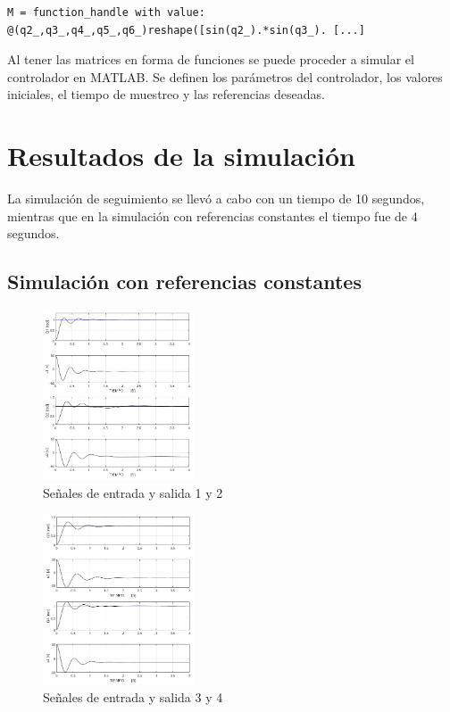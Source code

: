 \documentclass[conference]{IEEEtran}
\begin{document}
\begin{lstlisting}
M = function_handle with value: 
@(q2_,q3_,q4_,q5_,q6_)reshape([sin(q2_).*sin(q3_). [...]
\end{lstlisting}

Al tener las matrices en forma de funciones se puede proceder a simular el controlador en MATLAB. Se definen los parámetros del controlador, los valores iniciales, el tiempo de muestreo y las referencias deseadas.


\section{Resultados de la simulación}
La simulación de seguimiento se llevó a cabo con un tiempo de 10 segundos, mientras que en la simulación con referencias constantes el tiempo fue de 4 
segundos.

\subsection{Simulación con referencias constantes}

\begin{figure} [h]
\centering
\includegraphics[width=0.4\textwidth]{images/normal/q1_q2.jpg}
\caption{Señales de entrada y salida 1 y 2}
\end{figure}


\begin{figure} [h]
\centering
\includegraphics[width=0.4\textwidth]{images/normal/q3_q4.jpg}
\caption{Señales de entrada y salida 3 y 4}
\end{figure}
\end{document}
